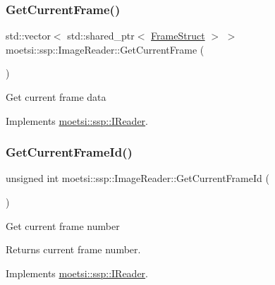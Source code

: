 \subsubsection{\texorpdfstring{Get\+Current\+Frame()}{GetCurrentFrame()}}
{\footnotesize\ttfamily std\+::vector$<$ std\+::shared\+\_\+ptr$<$ \hyperlink{structmoetsi_1_1ssp_1_1FrameStruct}{Frame\+Struct} $>$ $>$ moetsi\+::ssp\+::\+Image\+Reader\+::\+Get\+Current\+Frame (\begin{DoxyParamCaption}{ }\end{DoxyParamCaption})\hspace{0.3cm}{\ttfamily [virtual]}}

Get current frame data 

Implements \hyperlink{classmoetsi_1_1ssp_1_1IReader_a357439182128e3911d77335c136035c0}{moetsi\+::ssp\+::\+I\+Reader}.

\mbox{\label{classmoetsi_1_1ssp_1_1ImageReader_a386125736df9f25e5c4312bb679ff031}} 
\subsubsection{\texorpdfstring{Get\+Current\+Frame\+Id()}{GetCurrentFrameId()}}
{\footnotesize\ttfamily unsigned int moetsi\+::ssp\+::\+Image\+Reader\+::\+Get\+Current\+Frame\+Id (\begin{DoxyParamCaption}{ }\end{DoxyParamCaption})\hspace{0.3cm}{\ttfamily [virtual]}}

Get current frame number \begin{DoxyReturn}{Returns}
current frame number. 
\end{DoxyReturn}


Implements \hyperlink{classmoetsi_1_1ssp_1_1IReader_ac292d83eb06dee277baaa06e281a562d}{moetsi\+::ssp\+::\+I\+Reader}.

\mbox{\label{classmoetsi_1_1ssp_1_1ImageReader_a86adfec8106c366aaf1ec63e2a7da156}} 

